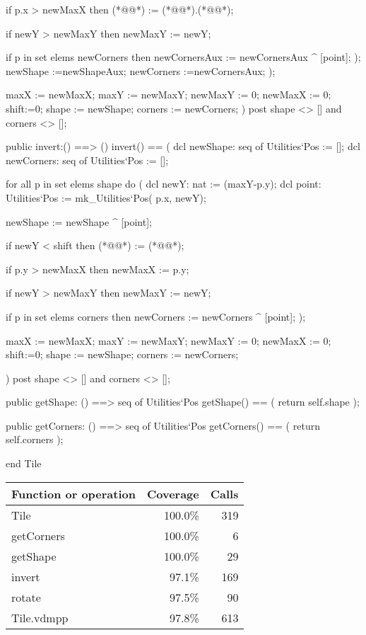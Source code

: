 \begin{vdm_al}
                  if p.x > newMaxX then
            (*@@*) := (*@@*).(*@@*);
            
          if newY > newMaxY then
            newMaxY := newY;
          
          if p in set elems newCorners then
                newCornersAux := newCornersAux ^ [point];
              );
              newShape :=newShapeAux;
              newCorners :=newCornersAux;
            );
            
            maxX := newMaxX;
            maxY := newMaxY;
            newMaxY := 0;
            newMaxX := 0;
            shift:=0;
            shape := newShape;
            corners := newCorners;
        )
        post shape <> [] and corners <> [];
        
        public invert:() ==> ()
        invert() == (
          dcl newShape: seq of Utilities`Pos := [];
          dcl newCorners: seq of Utilities`Pos := [];
          
          for all p in set elems shape do (
            dcl newY: nat := (maxY-p.y);
            dcl point: Utilities`Pos := mk_Utilities`Pos( p.x, newY);
            
            newShape := newShape ^ [point];
            
            if newY < shift then
              (*@@*) := (*@@*);
            
                if p.y > newMaxX then
          newMaxX := p.y;
          
        if newY > newMaxY then
          newMaxY := newY;
        
        if p in set elems corners then
              newCorners := newCorners ^ [point];
            );
            
            maxX := newMaxX;
            maxY := newMaxY;
            newMaxY := 0;
            newMaxX := 0;
            shift:=0;
            shape := newShape;
            corners := newCorners;
          
        )
        post shape <> [] and corners <> [];

        public getShape: () ==> seq of Utilities`Pos
          getShape() == (
            return self.shape
          );
          
      public getCorners: () ==> seq of Utilities`Pos
          getCorners() == (
            return self.corners
          );
        
end Tile
\end{vdm_al}
\bigskip
\begin{longtable}{|l|r|r|}
\hline
Function or operation & Coverage & Calls \\
\hline
\hline
Tile & 100.0\% & 319 \\
\hline
getCorners & 100.0\% & 6 \\
\hline
getShape & 100.0\% & 29 \\
\hline
invert & 97.1\% & 169 \\
\hline
rotate & 97.5\% & 90 \\
\hline
\hline
Tile.vdmpp & 97.8\% & 613 \\
\hline
\end{longtable}


